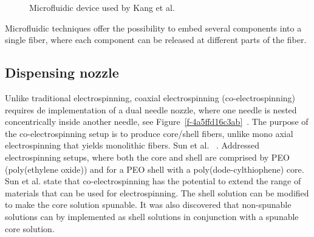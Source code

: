 \bgroup
\begin{figure}[!htbp]
\centering \makeatletter{}
\makeatother 
\caption{{Microfluidic device used by Kang et al.\unskip~\protect\cite{527120:13656548}}}
\label{f-c0beae2757bf}
\end{figure}
\egroup
Microfluidic techniques offer the possibility to embed several components into a single fiber, where each component can be released at different parts of the fiber. 



\subsection{Dispensing nozzle}Unlike traditional electrospinning, coaxial electrospinning (co-electrospinning) requires de implementation of a dual needle nozzle, where one needle is nested concentrically inside another needle, see Figure~\ref{f-4a5ffd16c3ab}\unskip~\cite{527120:13914792,527120:13914793}. The purpose of the co-electrospinning setup is to produce core/shell fibers, unlike mono axial electrospinning that yields monolithic fibers. Sun et al. \unskip~\cite{527120:13914312}. Addressed electrospinning setups, where both the core and shell are comprised by PEO (poly(ethylene oxide)) and for a PEO shell with a poly(dode-cylthiophene) core. Sun et al. state that co-electrospinning has the potential to extend the range of materials that can be used for electrospinning. The shell solution can be modified to make the core solution spunable. It was also discovered that non-spunable solutions can by implemented as shell solutions in conjunction with a spunable core solution. \unskip~\cite{527120:13914968}


